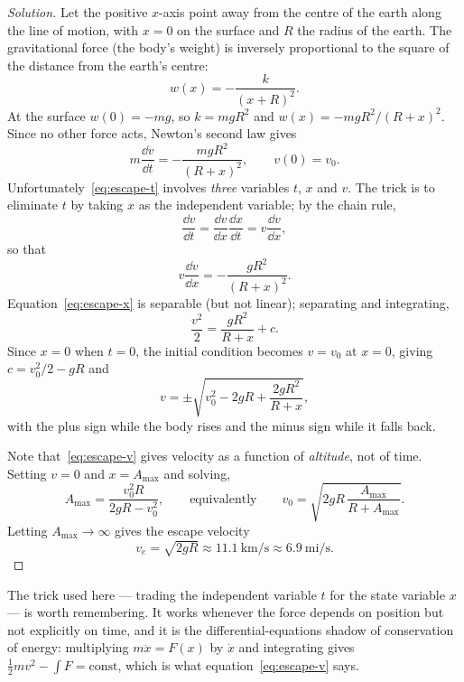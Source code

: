 \begin{proof}[Solution]
	Let the positive \(x\)-axis point away from the centre of the earth along the line of
	motion, with \(x = 0\) on the surface and \(R\) the radius of the earth. The
	gravitational force (the body's weight) is inversely proportional to the square of the
	distance from the earth's centre:
	\[
		w(x) = -\frac{k}{(x+R)^2}.
	\]
	At the surface \(w(0) = -mg\), so \(k = mgR^2\) and \(w(x) = -mgR^2/(R+x)^2\). Since
	no other force acts, Newton's second law gives
	\begin{equation}\label{eq:escape-t}
		m \frac{\dd v}{\dd t} = -\frac{mgR^2}{(R+x)^2}, \qquad v(0) = v_0.
	\end{equation}
	Unfortunately~\eqref{eq:escape-t} involves \emph{three} variables \(t\), \(x\) and
	\(v\). The trick is to eliminate \(t\) by taking \(x\) as the independent variable;
	by the chain rule,
	\[
		\frac{\dd v}{\dd t} = \frac{\dd v}{\dd x}\frac{\dd x}{\dd t}
		= v \frac{\dd v}{\dd x},
	\]
	so that
	\begin{equation}\label{eq:escape-x}
		v \frac{\dd v}{\dd x} = -\frac{gR^2}{(R+x)^2}.
	\end{equation}
	Equation~\eqref{eq:escape-x} is separable (but not linear); separating and
	integrating,
	\[
		\frac{v^2}{2} = \frac{gR^2}{R+x} + c.
	\]
	Since \(x = 0\) when \(t = 0\), the initial condition becomes \(v = v_0\) at
	\(x = 0\), giving \(c = v_0^2/2 - gR\) and
	\begin{equation}\label{eq:escape-v}
		v = \pm\sqrt{v_0^2 - 2gR + \frac{2gR^2}{R+x}},
	\end{equation}
	with the plus sign while the body rises and the minus sign while it falls back.

	Note that~\eqref{eq:escape-v} gives velocity as a function of \emph{altitude}, not of
	time. Setting \(v = 0\) and \(x = A_{\max}\) and solving,
	\[
		A_{\max} = \frac{v_0^2 R}{2gR - v_0^2},
		\qquad\text{equivalently}\qquad
		v_0 = \sqrt{2gR\,\frac{A_{\max}}{R + A_{\max}}}.
	\]
	Letting \(A_{\max} \to \infty\) gives the escape velocity
	\begin{equation}\label{eq:ve}
		v_e = \sqrt{2gR} \approx \SI{11.1}{\kilo\metre\per\second}
		\approx 6.9\ \text{mi/s}.
	\end{equation}
\end{proof}

\begin{observation}
	The trick used here --- trading the independent variable \(t\) for the state variable
	\(x\) --- is worth remembering. It works whenever the force depends on position but
	not explicitly on time, and it is the differential-equations shadow of conservation of
	energy: multiplying \(m\ddot{x} = F(x)\) by \(\dot x\) and integrating gives
	\(\frac12 m v^2 - \int F = \text{const}\), which is what
	equation~\eqref{eq:escape-v} says.
\end{observation}


